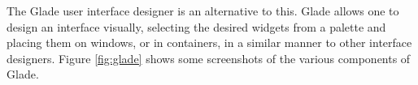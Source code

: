 \documentclass[a4paper,oneside]{article}
\begin{document}
The Glade user interface designer is an alternative to this.  Glade
allows one to design an interface visually, selecting the desired
widgets from a palette and placing them on windows, or in containers,
in a similar manner to other interface designers.  Figure
\ref{fig:glade} shows some screenshots of the various components of
Glade.

\begin{figure}
  \centering
\end{figure}
\end{document}
